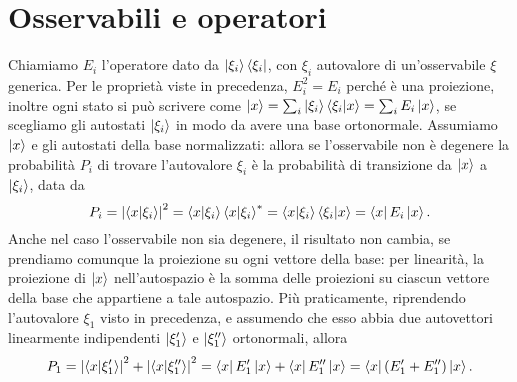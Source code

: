 \section{Osservabili e operatori}
Chiamiamo $E_i$ l'operatore dato da $\left|{\xi_i}\right\rangle\left\langle{\xi_i}\right|$, con $\xi_i$ autovalore di un'osservabile $\xi$ generica.
Per le proprietà viste in precedenza, $E_i^2=E_i$ perch\'e è una proiezione, inoltre ogni stato si può scrivere come $\left|{x}\right\rangle=\sum_i\left|{\xi_i}\right\rangle\left\langle{\xi_i}\middle|{x}\right\rangle=\sum_iE_i\left|{x}\right\rangle$, se scegliamo gli autostati $\left|{\xi_i}\right\rangle$ in modo da avere una base ortonormale.
Assumiamo $\left|{x}\right\rangle$ e gli autostati della base normalizzati: allora se l'osservabile non è degenere la probabilità $P_i$ di trovare l'autovalore $\xi_i$ è la probabilità di transizione da $\left|{x}\right\rangle$ a $\left|{\xi_i}\right\rangle$, data da
\begin{equation}
	P_i=\left|{\left\langle{x}\middle|{\xi_i}\right\rangle}\right|^2=\left\langle{x}\middle|{\xi_i}\right\rangle\left\langle{x}\middle|{\xi_i}\right\rangle^*=\left\langle{x}\middle|{\xi_i}\right\rangle\left\langle{\xi_i}\middle|{x}\right\rangle=\left\langle{x}\right|E_i\left|{x}\right\rangle.
	\label{eq:probabilita-proiezione-non-degenere}
\end{equation}
Anche nel caso l'osservabile non sia degenere, il risultato non cambia, se prendiamo comunque la proiezione su ogni vettore della base: per linearità, la proiezione di $\left|{x}\right\rangle$ nell'autospazio è la somma delle proiezioni su ciascun vettore della base che appartiene a tale autospazio.
Più praticamente, riprendendo l'autovalore $\xi_1$ visto in precedenza, e assumendo che esso abbia due autovettori linearmente indipendenti $\left|{\xi_1'}\right\rangle$ e $\left|{\xi_1''}\right\rangle$ ortonormali, allora
\begin{equation}
	P_1=\left|{\left\langle{x}\middle|{\xi_1'}\right\rangle}\right|^2+\left|{\left\langle{x}\middle|{\xi_1''}\right\rangle}\right|^2=\left\langle{x}\right|E_1'\left|{x}\right\rangle+\left\langle{x}\right|E_1''\left|{x}\right\rangle=\left\langle{x}\right|(E_1'+E_1'')\left|{x}\right\rangle.
	\label{eq:probabilita-proiezione-degenere}
\end{equation}

